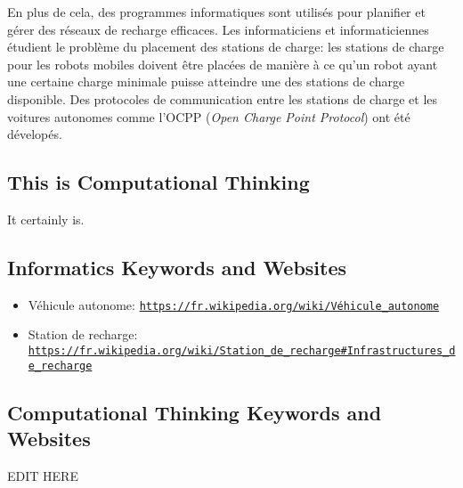 \documentclass[a4paper,11pt]{report}
\newcommand{\BrochureUrlText}[1]{\texttt{#1}}
\begin{document}
En plus de cela, des programmes informatiques sont utilisés pour planifier et gérer des réseaux de recharge efficaces. Les informaticiens et informaticiennes étudient le problème du placement des stations de charge: les stations de charge pour les robots mobiles doivent être placées de manière à ce qu’un robot ayant une certaine charge minimale puisse atteindre une des stations de charge disponible. Des protocoles de communication entre les stations de charge et les voitures autonomes comme l’OCPP (\emph{Open Charge Point Protocol}) ont été dévelopés.


\subsection*{This is Computational Thinking}

It certainly is.


\subsection*{Informatics Keywords and Websites}

\begin{itemize}
  \item Véhicule autonome: \href{https://fr.wikipedia.org/wiki/V\%C3\%A9hicule_autonome}{\BrochureUrlText{https://fr.wikipedia.org/wiki/Véhicule\_autonome}}
  \item Station de recharge: \href{https://fr.wikipedia.org/wiki/Station_de_recharge\#Infrastructures_de_recharge}{\BrochureUrlText{https://fr.wikipedia.org/wiki/Station\_de\_recharge\#Infrastructures\_de\_recharge}}
\end{itemize}


\subsection*{Computational Thinking Keywords and Websites}

EDIT HERE
\end{document}
